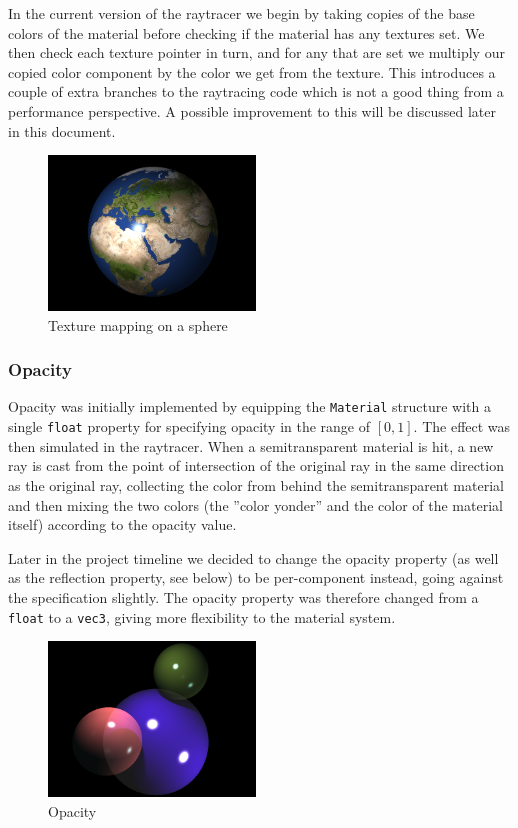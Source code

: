 \documentclass[a4paper,11pt]{article}
\begin{document}
In the current version of the raytracer we begin by taking copies of the base colors of the
material before checking if the material has any textures set. We then check each texture
pointer in turn, and for any that are set we multiply our copied color component by the
color we get from the texture. This introduces a couple of extra branches to the raytracing
code which is not a good thing from a performance perspective. A possible improvement to 
this will be discussed later in this document.

\begin{figure}[H]
\begin{center}
\includegraphics[width=5.5cm]{texmap-earth.png}
\caption{Texture mapping on a sphere}
\end{center}
\end{figure}
\vspace{-0.5cm}

\subsubsection{Opacity}
Opacity was initially implemented by equipping the \texttt{Material} structure with a single \texttt{float}
property for specifying opacity in the range of $[0,1]$. The effect was then simulated in
the raytracer. When a semitransparent material is hit, a new ray is cast from the point of
intersection of the original ray in the same direction as the original ray, collecting the
color from behind the semitransparent material and then mixing the two colors (the ''color
yonder'' and the color of the material itself) according to the opacity value.

Later in the project timeline we decided to change the opacity property (as well as the
reflection property, see below) to be per-component instead, going against the specification
slightly. The opacity property was therefore changed from a \texttt{float} to a \texttt{vec3}, giving more
flexibility to the material system.

\begin{figure}[H]
\begin{center}
\includegraphics[width=5.5cm]{opac.png}
\caption{Opacity}
\end{center}
\end{figure}
\vspace{-0.5cm}
\end{document}
